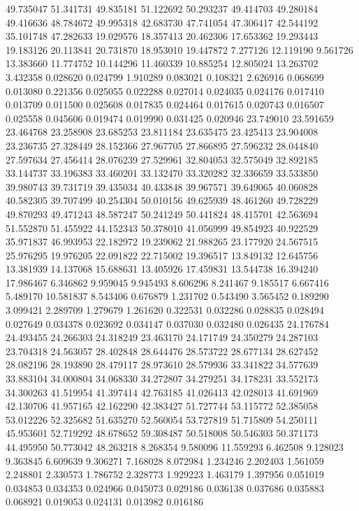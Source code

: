 49.735047
51.341731
49.835181
51.122692
50.293237
49.414703
49.280184
49.416636
48.784672
49.995318
42.683730
47.741054
47.306417
42.544192
35.101748
47.282633
19.029576
18.357413
20.462306
17.653362
19.293443
19.183126
20.113841
20.731870
18.953010
19.447872
7.277126
12.119190
9.561726
13.383660
11.774752
10.144296
11.460339
10.885254
12.805024
13.263702
3.432358
0.028620
0.024799
1.910289
0.083021
0.108321
2.626916
0.068699
0.013080
0.221356
0.025055
0.022288
0.027014
0.024035
0.024176
0.017410
0.013709
0.011500
0.025608
0.017835
0.024464
0.017615
0.020743
0.016507
0.025558
0.045606
0.019474
0.019990
0.031425
0.020946
23.749010
23.591659
23.464768
23.258908
23.685253
23.811184
23.635475
23.425413
23.904008
23.236735
27.328449
28.152366
27.967705
27.866895
27.596232
28.044840
27.597634
27.456414
28.076239
27.529961
32.804053
32.575049
32.892185
33.144737
33.196383
33.460201
33.132470
33.320282
32.336659
33.533850
39.980743
39.731719
39.435034
40.433848
39.967571
39.649065
40.060828
40.582305
39.707499
40.254304
50.010156
49.625939
48.461260
49.728229
49.870293
49.471243
48.587247
50.241249
50.441824
48.415701
42.563694
51.552870
51.455922
44.152343
50.378010
41.056999
49.854923
40.922529
35.971837
46.993953
22.182972
19.239062
21.988265
23.177920
24.567515
25.976295
19.976205
22.091822
22.715002
19.396517
13.849132
12.645756
13.381939
14.137068
15.688631
13.405926
17.459831
13.544738
16.394240
17.986467
6.346862
9.959045
9.945493
8.606296
8.241467
9.185517
6.667416
5.489170
10.581837
8.543406
0.676879
1.231702
0.543490
3.565452
0.189290
3.099421
2.289709
1.279679
1.261620
0.322531
0.032286
0.028835
0.028494
0.027649
0.034378
0.023692
0.034147
0.037030
0.032480
0.026435
24.176784
24.493455
24.266303
24.318249
23.463170
24.171749
24.350279
24.287103
23.704318
24.563057
28.402848
28.644476
28.573722
28.677134
28.627452
28.082196
28.193890
28.479117
28.973610
28.579936
33.341822
34.577639
33.883104
34.000804
34.068330
34.272807
34.279251
34.178231
33.552173
34.300263
41.519954
41.397414
42.763185
41.026413
42.028013
41.691969
42.130706
41.957165
42.162290
42.383427
51.727744
53.115772
52.385058
53.012226
52.325682
51.635270
52.560054
53.727819
51.715809
54.250111
45.953601
52.719292
48.678652
59.308487
50.518008
50.546303
50.371173
44.495950
50.773042
48.263218
8.268354
9.580096
11.559293
6.462508
9.128023
9.363845
6.609639
9.306271
7.168028
8.072984
1.234246
2.202403
1.561059
2.248801
2.330573
1.786752
2.328773
1.929223
1.463179
1.397956
0.051019
0.034853
0.034353
0.024966
0.045073
0.029186
0.036138
0.037686
0.035883
0.068921
0.019053
0.024131
0.013982
0.016186
